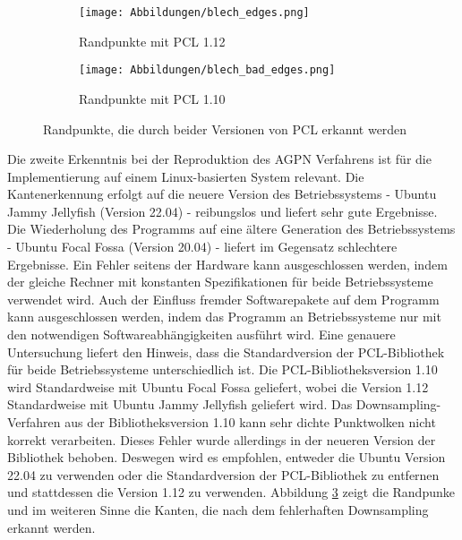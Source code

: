 \begin{figure}[h]
	\centering
	\begin{subfigure}[h]{0.49\textwidth}
		\texttt{[image: Abbildungen/blech\_edges.png]}
		\centering
		\caption{Randpunkte mit PCL 1.12}
		\label{fig: blech_edges}
	\end{subfigure}
	\hfill
	\begin{subfigure}[h]{0.49\textwidth}
		\texttt{[image: Abbildungen/blech\_bad\_edges.png]}
		\centering
		\caption{Randpunkte mit PCL 1.10}
		\label{fig: bad_edges}
	\end{subfigure}
	\caption{Randpunkte, die durch beider Versionen von PCL erkannt werden}
	\label{fig: pcl_version_comparision}
\end{figure}

Die zweite Erkenntnis bei der Reproduktion des AGPN Verfahrens ist für die Implementierung auf einem Linux-basierten System relevant. Die Kantenerkennung erfolgt auf die neuere Version des Betriebssystems - Ubuntu Jammy Jellyfish (Version 22.04) - reibungslos und liefert sehr gute Ergebnisse. Die Wiederholung des Programms auf eine ältere Generation des Betriebssystems - Ubuntu Focal Fossa (Version 20.04) - liefert im Gegensatz schlechtere Ergebnisse. Ein Fehler seitens der Hardware kann ausgeschlossen werden, indem der gleiche Rechner mit konstanten Spezifikationen für beide Betriebssysteme verwendet wird. Auch der Einfluss fremder Softwarepakete auf dem Programm kann ausgeschlossen werden, indem das Programm an Betriebssysteme nur mit den notwendigen Softwareabhängigkeiten ausführt wird. Eine genauere Untersuchung liefert den Hinweis, dass die Standardversion der PCL-Bibliothek für beide Betriebssysteme unterschiedlich ist. Die PCL-Bibliotheksversion 1.10 wird Standardweise mit Ubuntu Focal Fossa geliefert, wobei die Version 1.12 Standardweise mit Ubuntu Jammy Jellyfish geliefert wird. Das Downsampling-Verfahren aus der Bibliotheksversion 1.10 kann sehr dichte Punktwolken nicht korrekt verarbeiten. Dieses Fehler wurde allerdings in der neueren Version der Bibliothek behoben. Deswegen wird es empfohlen, entweder die Ubuntu Version 22.04 zu verwenden oder die Standardversion der PCL-Bibliothek zu entfernen und stattdessen die Version 1.12 zu verwenden. Abbildung \ref{fig: pcl_version_comparision} zeigt die Randpunke und im weiteren Sinne die Kanten, die nach dem fehlerhaften Downsampling erkannt werden.


